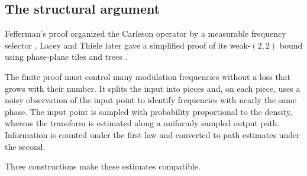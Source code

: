 \subsection{The structural argument}

Fefferman's proof organized the Carleson operator by a measurable frequency
selector \cite{Fefferman1973,Fefferman1997Erratum}.
Lacey and Thiele later gave a simplified proof of its weak-$(2,2)$ bound
using phase-plane tiles and trees \cite{LaceyThiele2000}.

The finite proof must control many modulation frequencies without a loss
that grows with their number. It splits the input into pieces and, on
each piece, uses a noisy observation of the input point to identify
frequencies with nearly the same phase. The input point is sampled with
probability proportional to the density, whereas the transform is
estimated along a uniformly sampled output path. Information is counted
under the first law and converted to path estimates under the second.

Three constructions make these estimates compatible.

